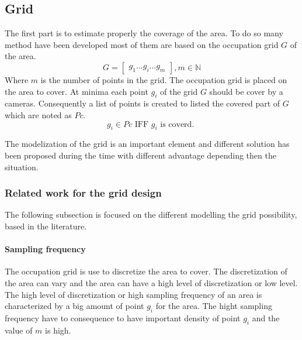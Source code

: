 \subsection{Grid}



The first part is to estimate properly the coverage of the area. To do so many method have been developed most of them are based on the occupation grid $G$ of the area. 
\begin{equation}\label{eq:Grid}
	G=\begin{bmatrix}
	 	g_1 ...g_i ... g_m
	\end{bmatrix}  , m\in \mathbb{N}
\end{equation}
Where $m$ is the number of points in the grid.
The occupation grid is placed on the area to cover. At minima each point $g_i$ of the grid $G$ should be cover by a cameras. Consequently a list of points is created to listed the covered part of $G$ which are noted as $Pc$.
\begin{equation}\label{eq:Pci}
g_i \in Pc \mbox{ IFF } g_i \mbox{ is coverd. }
\end{equation}


The modelization of the grid is an important element and different solution has been proposed during the time with different advantage depending then the situation.\\

\subsubsection*{Related work for the grid design}
The following subsection is focused on the different  modelling the grid possibility, based in the literature. 

\paragraph*{ Sampling frequency} %
The occupation grid is use to discretize the area to cover. The discretization of the area can vary and the area can have a high level of discretization or low level. 
The high level of discretization or high sampling frequency of an area is characterized by a big amount of point $g_i$ for the area. The hight sampling frequency have to consequence to have important density of point $g_i$ and the value of $m$ is high. 

